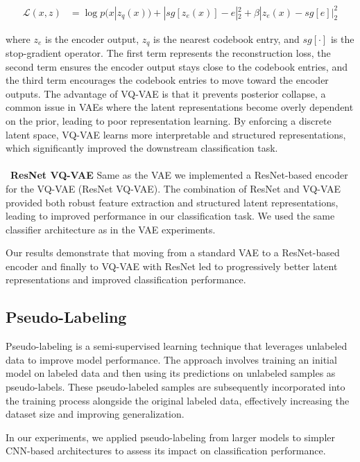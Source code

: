 \documentclass{article}
\begin{document}
\begin{align}
  \mathcal{L}(x, z) & = \log p(x|z_q(x)) + | sg[z_e(x)] - e |_2^2 + \beta | z_e(x) - sg[e]  |_2^2
\end{align}



where $z_e$ is the encoder output, $z_q$ is the nearest codebook entry, and $sg[\cdot]$ is the stop-gradient operator. The first term represents the reconstruction loss, the second term ensures the encoder output stays close to the codebook entries, and the third term encourages the codebook entries to move toward the encoder outputs. The advantage of VQ-VAE is that it prevents posterior collapse, a common issue in VAEs where the latent representations become overly dependent on the prior, leading to poor representation learning. By enforcing a discrete latent space, VQ-VAE learns more interpretable and structured representations, which significantly improved the downstream classification task.
\\\
\\\
\textbf{ResNet VQ-VAE}
Same as the VAE we implemented a ResNet-based encoder for the VQ-VAE (ResNet VQ-VAE). The combination of ResNet and VQ-VAE provided both robust feature extraction and structured latent representations, leading to improved performance in our classification task. We used the same classifier architecture as in the VAE experiments.

Our results demonstrate that moving from a standard VAE to a ResNet-based encoder and finally to VQ-VAE with ResNet led to progressively better latent representations and improved classification performance.


\subsection{Pseudo-Labeling}

Pseudo-labeling is a semi-supervised learning technique that leverages
unlabeled data to improve model performance. The approach involves training an
initial model on labeled data and then using its predictions on unlabeled
samples as pseudo-labels. These pseudo-labeled samples are subsequently
incorporated into the training process alongside the original labeled data,
effectively increasing the dataset size and improving generalization.

In our experiments, we applied pseudo-labeling from larger models to simpler
CNN-based architectures to assess its impact on classification performance.
\end{document}
